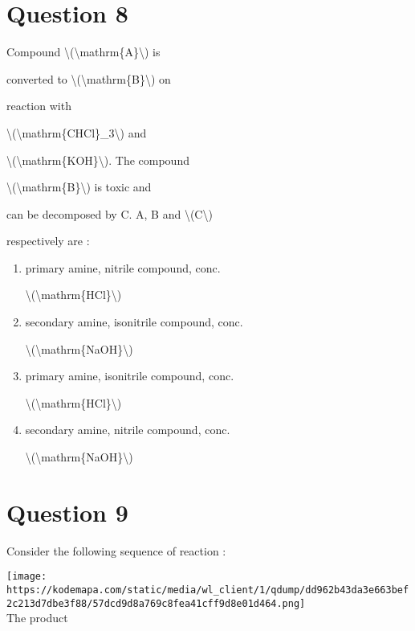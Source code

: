 \documentclass{article}
\begin{document}
\section*{Question 8}
Compound \textbackslash(\textbackslash mathrm\{A\}\textbackslash) is

converted to \textbackslash(\textbackslash mathrm\{B\}\textbackslash) on

reaction with

\textbackslash(\textbackslash mathrm\{CHCl\}\_3\textbackslash) and

\textbackslash(\textbackslash mathrm\{KOH\}\textbackslash). The compound

\textbackslash(\textbackslash mathrm\{B\}\textbackslash) is toxic and

can be decomposed by C. A, B and \textbackslash(C\textbackslash)

respectively are :


\begin{enumerate}[label=(\alph*)]
\item primary amine, nitrile compound, conc.

\textbackslash(\textbackslash mathrm\{HCl\}\textbackslash)


\item secondary amine, isonitrile compound, conc.

\textbackslash(\textbackslash mathrm\{NaOH\}\textbackslash)


\item primary amine, isonitrile compound, conc.

\textbackslash(\textbackslash mathrm\{HCl\}\textbackslash)


\item secondary amine, nitrile compound, conc.

\textbackslash(\textbackslash mathrm\{NaOH\}\textbackslash)


\end{enumerate}
\newpage
\section*{Question 9}
Consider the following sequence of reaction :



\texttt{[image: https://kodemapa.com/static/media/wl\_client/1/qdump/dd962b43da3e663bef2c213d7dbe3f88/57dcd9d8a769c8fea41cff9d8e01d464.png]}\\



The product \textquotesingle{}
\end{document}
